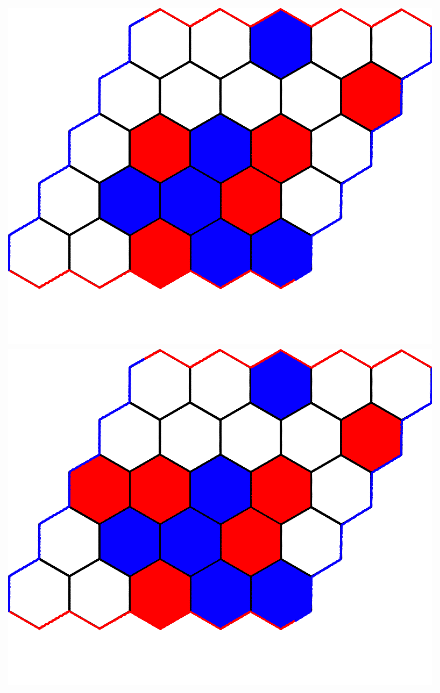 \documentclass[a4paper]{article}
\begin{document}
\begin{figure}[t]
\begin{minipage}[t]{.24\linewidth}
    \includegraphics[width=\linewidth]{figures/example_game/ex_game_t11.png}
    \end{minipage}
    \begin{minipage}[t]{.24\linewidth}
    \includegraphics[width=\linewidth]{figures/example_game/ex_game_t12.png}
    \end{minipage}
    \begin{center}
    \begin{minipage}[t]{.35\linewidth}

\end{minipage}
\end{center}
\end{figure}
\end{document}
